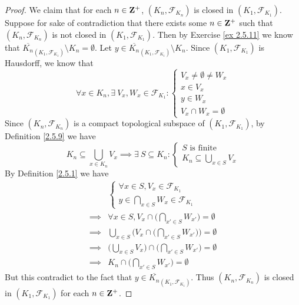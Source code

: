 \begin{proof}
    We claim that for each \(n \in \mathbf{Z}^+\), \((K_n, \mathcal{F}_{K_n})\) is closed in \((K_1, \mathcal{F}_{K_1})\).
    Suppose for sake of contradiction that there exists some \(n \in \mathbf{Z}^+\) such that \((K_n, \mathcal{F}_{K_n})\) is not closed in \((K_1, \mathcal{F}_{K_1})\).
    Then by Exercise \ref{ex 2.5.11} we know that \(\overline{K_n}_{(K_1, \mathcal{F}_{K_1})} \setminus K_n = \emptyset\).
    Let \(y \in \overline{K_n}_{(K_1, \mathcal{F}_{K_1})} \setminus K_n\).
    Since \((K_1, \mathcal{F}_{K_1})\) is Hausdorff, we know that
    \[
        \forall x \in K_n, \exists\ V_x, W_x \in \mathcal{F}_{K_1} : \begin{cases}
            V_x \neq \emptyset \neq W_x \\
            x \in V_x                   \\
            y \in W_x                   \\
            V_x \cap W_x = \emptyset
        \end{cases}
    \]
    Since \((K_n, \mathcal{F}_{K_n})\) is a compact topological subspace of \((K_1, \mathcal{F}_{K_1})\), by Definition \ref{2.5.9} we have
    \[
        K_n \subseteq \bigcup_{x \in K_n} V_x \implies \exists\ S \subseteq K_n : \begin{cases}
            S \text{ is finite} \\
            K_n \subseteq \bigcup_{x \in S} V_x
        \end{cases}
    \]
    By Definition \ref{2.5.1} we have
    \begin{align*}
                 & \begin{cases}
                       \forall x \in S, V_x \in \mathcal{F}_{K_1} \\
                       y \in \bigcap_{x \in S} W_x \in \mathcal{F}_{K_1}
                   \end{cases}                                         \\
        \implies & \forall x \in S, V_x \cap \bigg(\bigcap_{x' \in S} W_{x'}\bigg) = \emptyset              \\
        \implies & \bigcup_{x \in S} \Bigg(V_x \cap \bigg(\bigcap_{x' \in S} W_{x'}\bigg)\Bigg) = \emptyset \\
        \implies & \bigg(\bigcup_{x \in S} V_x\bigg) \cap \bigg(\bigcap_{x' \in S} W_{x'}\bigg) = \emptyset \\
        \implies & K_n \cap \bigg(\bigcap_{x' \in S} W_{x'}\bigg) = \emptyset
    \end{align*}
    But this contradict to the fact that \(y \in \overline{K_n}_{(K_1, \mathcal{F}_{K_1})}\).
    Thus \((K_n, \mathcal{F}_{K_n})\) is closed in \((K_1, \mathcal{F}_{K_1})\) for each \(n \in \mathbf{Z}^+\).


\end{proof}
